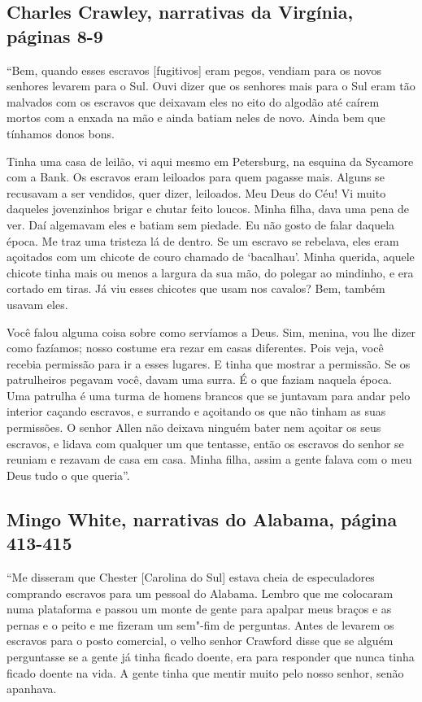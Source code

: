 \subsection{Charles Crawley, narrativas da Virgínia, páginas 8-9} \label{ref61}

``Bem, quando esses escravos {[}fugitivos{]} eram pegos, vendiam para os
novos senhores levarem para o Sul. Ouvi dizer que os senhores mais para
o Sul eram tão malvados com os escravos que deixavam eles no eito do
algodão até caírem mortos com a enxada na mão e ainda batiam neles de
novo. Ainda bem que tínhamos donos bons.

Tinha uma casa de leilão, vi aqui mesmo em Petersburg, na esquina da
Sycamore com a Bank. Os escravos eram leiloados para quem pagasse mais.
Alguns se recusavam a ser vendidos, quer dizer, leiloados. Meu Deus do
Céu! Vi muito daqueles jovenzinhos brigar e chutar feito loucos. Minha
filha, dava uma pena de ver. Daí algemavam eles e batiam sem piedade. Eu
não gosto de falar daquela época. Me traz uma tristeza lá de dentro. Se
um escravo se rebelava, eles eram açoitados com um chicote de couro
chamado de `bacalhau'. Minha querida, aquele chicote tinha mais ou menos
a largura da sua mão, do polegar ao mindinho, e era cortado em tiras. Já
viu esses chicotes que usam nos cavalos? Bem, também usavam eles.

Você falou alguma coisa sobre como servíamos a Deus. Sim, menina, vou
lhe dizer como fazíamos; nosso costume era rezar em casas diferentes.
Pois veja, você recebia permissão para ir a esses lugares. E tinha que
mostrar a permissão. Se os patrulheiros pegavam você, davam uma surra. É
o que faziam naquela época. Uma patrulha é uma turma de homens brancos
que se juntavam para andar pelo interior caçando escravos, e surrando e
açoitando os que não tinham as suas permissões. O senhor Allen não
deixava ninguém bater nem açoitar os seus escravos, e lidava com
qualquer um que tentasse, então os escravos do senhor se reuniam e
rezavam de casa em casa. Minha filha, assim a gente falava com o meu
Deus tudo o que queria''.

\subsection{Mingo White, narrativas do Alabama, página 413-415}
\label{ref287}

``Me disseram que Chester {[}Carolina do Sul{]} estava cheia de
especuladores comprando escravos para um pessoal do Alabama. Lembro que
me colocaram numa plataforma e passou um monte de gente para apalpar
meus braços e as pernas e o peito e me fizeram um sem"-fim de perguntas.
Antes de levarem os escravos para o posto comercial, o velho senhor
Crawford disse que se alguém perguntasse se a gente já tinha ficado
doente, era para responder que nunca tinha ficado doente na vida. A
gente tinha que mentir muito pelo nosso senhor, senão apanhava.

